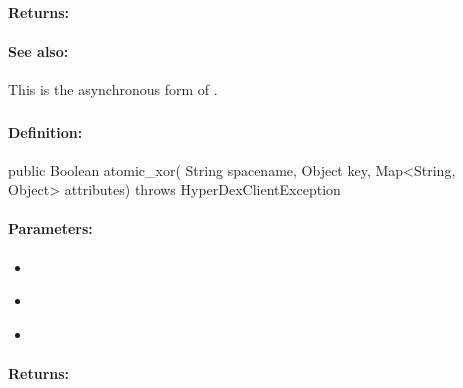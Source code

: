 \paragraph{Returns:}


\paragraph{See also:}  This is the asynchronous form of .

\pagebreak
\subsubsection{}
\label{api:java:atomic_xor}


\paragraph{Definition:}
\begin{javacode}
public Boolean atomic_xor(
        String spacename,
        Object key,
        Map<String, Object> attributes) throws HyperDexClientException
\end{javacode}

\paragraph{Parameters:}
\begin{itemize}[noitemsep]
\item {}\\

\item {}\\

\item {}\\

\end{itemize}

\paragraph{Returns:}


